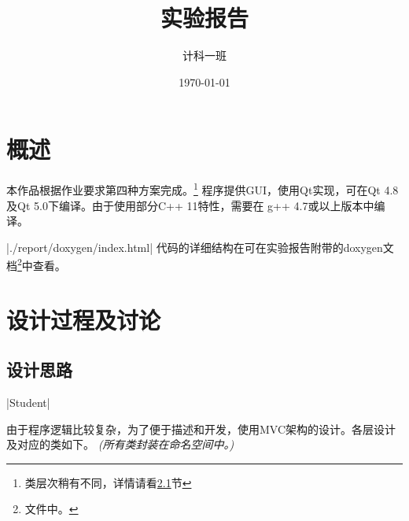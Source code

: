 \documentclass[adobefonts,a4paper]{ctexart}
\title{实验报告}
\author{计科一班\quad蔡日骏\quad12348003}
\date{\today}
\begin{document}
\maketitle
\section{概述}
本作品根据作业要求第四种方案完成。\footnote{类层次稍有不同，详情请看\ref{design}节}
程序提供GUI，使用Qt实现，可在Qt 4.8及Qt 5.0下编译。由于使用部分C++ 11特性，需要在
g++ 4.7或以上版本中编译。

|./report/doxygen/index.html|
代码的详细结构在可在实验报告附带的doxygen文档\footnote{文件中。}中查看。

\section{设计过程及讨论}
\subsection{设计思路}\label{design}

|Student|

由于程序逻辑比较复杂，为了便于描述和开发，使用MVC架构的设计。各层设计及对应的类如下。
\emph{(所有类封装在命名空间中。)}
\end{document}
